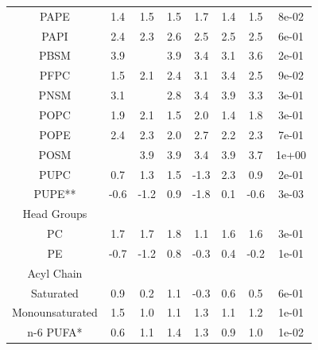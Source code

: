 \documentclass[9pt]{article}
\begin{document}
\begin{table}
{\begin{tabular}{| c || ccccc | cc|}
PAPE    &               1.4 &               1.5 &                1.5 &                1.7 &                1.4 &  1.5 &  8e-02 \\
PAPI    &               2.4 &               2.3 &                2.6 &                2.5 &                2.5 &  2.5 &  6e-01 \\
PBSM    &               3.9 &                &                3.9 &                3.4 &                3.1 &  3.6 &  2e-01 \\
PFPC    &               1.5 &               2.1 &                2.4 &                3.1 &                3.4 &  2.5 &  9e-02 \\
PNSM    &               3.1 &                &                2.8 &                3.4 &                3.9 &  3.3 &  3e-01 \\
POPC    &               1.9 &               2.1 &                1.5 &                2.0 &                1.4 &  1.8 &  3e-01 \\
POPE    &               2.4 &               2.3 &                2.0 &                2.7 &                2.2 &  2.3 &  7e-01 \\
POSM    &                &               3.9 &                3.9 &                3.4 &                3.9 &  3.7 &  1e+00 \\
PUPC    &               0.7 &               1.3 &                1.5 &               -1.3 &                2.3 &  0.9 &  2e-01 \\
PUPE**    &              -0.6 &              -1.2 &                0.9 &               -1.8 &                0.1 & -0.6 &  3e-03 \\
\hline
Head Groups &&&&&&&\\
PC      &               1.7 &               1.7 &                1.8 &               1.1 &                1.6 &  1.6  &    3e-01 \\
PE      &              -0.7 &              -1.2 &                0.8 &               -0.3 &                0.4 & -0.2 &  1e-01 \\
\hline
Acyl Chain &&&&&&&\\
Saturated      &               0.9 &               0.2 &                1.1 &               -0.3 &                0.6 &  0.5 &  6e-01 \\
Monounsaturated      &               1.5 &               1.0 &                1.1 &                1.3 &                1.1 &  1.2 &  1e-01 \\
n-6 PUFA*      &               0.6 &               1.1 &                1.4 &                1.3 &                0.9 &  1.0 &  1e-02 \\

\end{tabular}}
\end{table}
\end{document}
